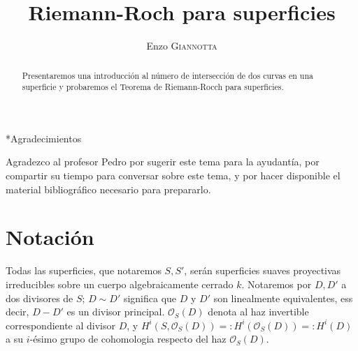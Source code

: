 \documentclass[spanish,12pt]{amsart}
\makeatletter
\renewcommand\subsection{\@startsection{subsection}{2}%
  \z@{.5\linespacing\@plus.7\linespacing}{-.5em}%
  {\normalfont\sffamily}}
\theoremstyle{definition}
\theoremstyle{remark}
\numberwithin{equation}{section}
\renewcommand{\O}{\mathcal{O}}
\makeatother
\begin{document}
\title{Riemann-Roch para superficies}

\author{Enzo \textsc{Giannotta}}





\begin{abstract}
Presentaremos una introducción al número de intersección de dos curvas en una superficie y probaremos el Teorema de Riemann-Rocch para superficies.
\end{abstract}

\maketitle

\tableofcontents








\subsection*{Agradecimientos}

Agradezco al profesor Pedro por sugerir este tema para la ayudantía, por compartir su tiempo para conversar sobre este tema, y por hacer disponible el material bibliográfico necesario para prepararlo.


\section{Notación}

Todas las superficies, que notaremos $S,S'$, serán superficies suaves proyectivas irreducibles sobre un cuerpo algebraicamente cerrado $k$. Notaremos por $D,D'$ a dos divisores de $S$; $D\sim D'$ significa que $D$ y $D'$ son linealmente equivalentes, ess decir, $D-D'$ es un divisor principal. $\O_S (D)$ denota al haz invertible correspondiente al divisor $D$, y $H^i (S, \O_S (D)) =: H^i (\O_S (D)) =: H^i (D)$ a su $i$-ésimo grupo de cohomologia respecto del haz $\O_S (D)$.
\end{document}
